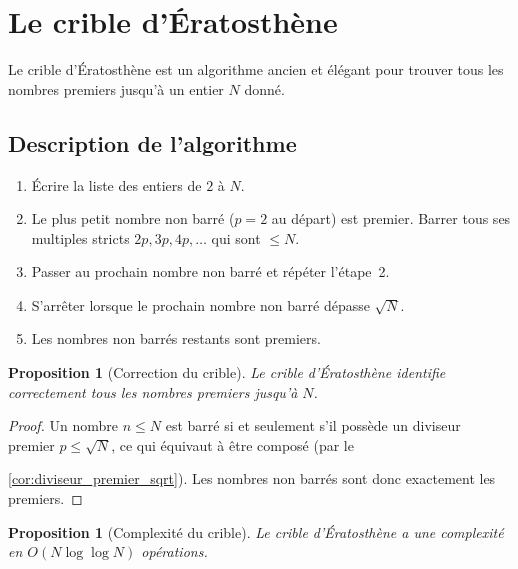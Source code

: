 \documentclass[12pt,a4paper,openany]{book}
\theoremstyle{definition}
\theoremstyle{plain}
\newtheorem{proposition}[definition]{Proposition}
\theoremstyle{remark}
\begin{document}
\section{Le crible d'Ératosthène}
\label{sec:ch2:eratosthene}


Le crible d'Ératosthène est un algorithme ancien et élégant pour trouver tous les
nombres premiers jusqu'à un entier $N$ donné.

\subsection{Description de l'algorithme}
\label{subsec:ch2:crible_algo}

\begin{enumerate}[label=\textbf{Étape \arabic*.}]
  \item Écrire la liste des entiers de $2$ à $N$.
  \item Le plus petit nombre non barré ($p = 2$ au départ) est premier. Barrer tous
    ses multiples stricts $2p, 3p, 4p, \ldots$ qui sont $\leq N$.
  \item Passer au prochain nombre non barré et répéter l'étape~2.
  \item S'arrêter lorsque le prochain nombre non barré dépasse $\sqrt{N}$.
  \item Les nombres non barrés restants sont premiers.
\end{enumerate}

\begin{proposition}[Correction du crible]
\label{prop:crible:correct}
Le crible d'Ératosthène identifie correctement tous les nombres premiers jusqu'à $N$.
\end{proposition}

\begin{proof}
Un nombre $n \leq N$ est barré si et seulement s'il possède un diviseur premier
$p \leq \sqrt{N}$, ce qui équivaut à être composé (par le






\ref{cor:diviseur_premier_sqrt}). Les nombres non barrés sont donc exactement les
premiers.
\end{proof}

\begin{proposition}[Complexité du crible]
\label{prop:crible:complexite}
Le crible d'Ératosthène a une complexité en $O(N \log \log N)$ opérations.
\end{proposition}
\end{document}
